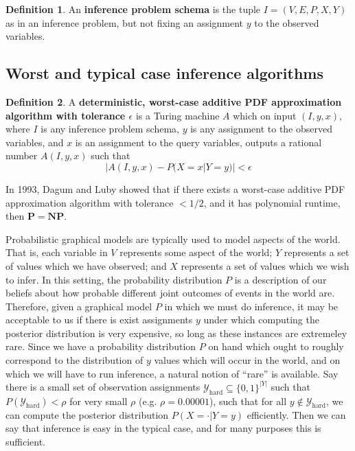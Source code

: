 \documentclass{article}
\renewcommand{\P}{\mathbf{P}}
\newcommand{\NP}{\mathbf{NP}}
\theoremstyle{definition}
\newtheorem{defn}{Definition}
\theoremstyle{remark}
\begin{document}
\begin{defn}
An \textbf{inference problem schema} is the tuple $I = (V, E, P, X, Y)$ as in an inference problem, but not fixing an assignment $y$ to the observed variables.
\end{defn}

\subsection{Worst and typical case inference algorithms}

\begin{defn}
A \textbf{deterministic, worst-case additive PDF approximation algorithm with tolerance $\epsilon$} is a Turing machine $A$ which on input
$(I, y, x)$, where $I$ is any inference problem schema, $y$ is any assignment to the observed variables, and $x$ is an assignment to the query variables, outputs a rational number $A(I, y, x)$ such that
$$
|A(I, y, x) - P(X = x | Y = y)| < \epsilon
$$
\end{defn}
In 1993, Dagum and Luby \cite{dagum1993} showed that if there exists a worst-case additive PDF approximation algorithm with tolerance $< 1/2$, and it has polynomial runtime, then $\P = \NP$.

Probabilistic graphical models are typically used to model aspects of the world.
That is, each variable in $V$ represents some aspect of the world; $Y$ represents a set of values which we have observed; and $X$ represents a set of values which we wish to infer.
In this setting, the probability distribution $P$ is a description of our beliefs about how probable different joint outcomes of events in the world are.
Therefore, given a graphical model $P$ in which we must do inference, it may be acceptable to us if there is exist assignments $y$ under which computing the posterior distribution is very expensive, so long as these instances are extremeley rare.
Since we have a probability distribution $P$ on hand which ought to roughly correspond to the distribution of $y$ values which will occur in the world, and on which we will have to run inference, a natural notion of ``rare'' is available.
Say there is a small set of observation assignments $\mathcal{Y}_\text{hard} \subseteq \{0, 1\}^{|Y|}$ such that $P(\mathcal{Y}_\text{hard}) < \rho$ for very small $\rho$ (e.g. $\rho = 0.00001$), such that for all $y \notin \mathcal{Y}_\text{hard}$, we can compute the posterior distribution $P(X = \cdot | Y = y)$ efficiently.
Then we can say that inference is easy in the typical case, and for many purposes this is sufficient.
\end{document}
